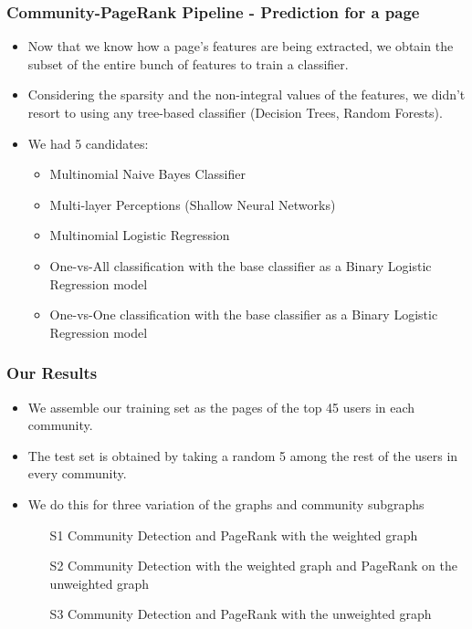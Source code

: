 \documentclass[9pt, compress]{beamer}
\begin{document}
\begin{frame}[fragile]
	\frametitle{Community-PageRank Pipeline - Prediction for a page}
\vspace{-10mm}
\begin{itemize}
\item Now that we know how a page's features are being extracted, we obtain the subset of the entire bunch of features to train a classifier.
\item Considering the sparsity and the non-integral values of the features, we didn't resort to using any tree-based classifier (Decision Trees, Random Forests).
\item We had 5 candidates:
\begin{itemize}
	\item Multinomial Naive Bayes Classifier
    \item Multi-layer Perceptions (Shallow Neural Networks)
    \item Multinomial Logistic Regression
    \item One-vs-All classification with the base classifier as a Binary Logistic Regression model
    \item One-vs-One classification with the base classifier as a Binary Logistic Regression model
\end{itemize}
\end{itemize}
\end{frame}

\begin{frame}[fragile]
	\frametitle{Our Results}
\vspace{-10mm}
\begin{itemize}
\item We assemble our training set as the pages of the top 45 users in each community.
\item The test set is obtained by taking a random 5 among the rest of the users in every community.
\item We do this for three variation of the graphs and community subgraphs
\begin{itemize}
	\item [S1] Community Detection and PageRank with the weighted graph
    \item [S2] Community Detection with the weighted graph and PageRank on the unweighted graph
    \item [S3] Community Detection and PageRank with the unweighted graph
\end{itemize}
\end{itemize}
\begin{center}
\end{center}
\end{frame}
\end{document}
